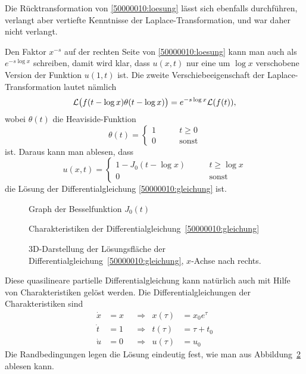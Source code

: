 \begin{diskussion}
Die Rücktransformation von \eqref{50000010:loesung} lässt sich
ebenfalls durchführen, verlangt aber vertiefte Kenntnisse der
Laplace-Transformation, und war daher nicht verlangt.

Den Faktor $x^{-s}$ auf der rechten Seite von \eqref{50000010:loesung}
kann man auch als $e^{-s\log x}$
schreiben, damit wird klar, dass $u(x,t)$ nur eine um $\log x$ verschobene
Version der Funktion $u(1,t)$ ist. 
Die zweite Verschiebeeigenschaft der Laplace-Transformation lautet nämlich
\[
{\cal L}\bigl(f(t-\log x)\theta(t-\log x)\bigr)
=
e^{-s\log x}{\cal L}(f(t)),
\]
wobei $\theta(t)$ die Heaviside-Funktion
\[
\theta(t)=\begin{cases}1\qquad&t \ge 0\\ 0&\text{sonst}\end{cases}
\]
ist. Daraus kann man ablesen, dass
\begin{equation}
u(x,t)=\begin{cases}
1-J_0(t-\log x)\qquad
&t \ge \log x\\
0
&\text{sonst}
\end{cases}
\label{50000010:ruecktransformiert}
\end{equation}
die Lösung der Differentialgleichung \eqref{50000010:gleichung} ist.
\begin{figure}
\centering
{}
\caption{Graph der Besselfunktion $J_0(t)$
\label{50000010:besselj0}}
\end{figure}
\begin{figure}
\centering
{}
\caption{Charakteristiken der Differentialgleichung~\eqref{50000010:gleichung}
\label{50000010:charakteristiken}}
\end{figure}
\begin{figure}
\centering
{}
\caption{3D-Darstellung der Lösungsfläche der
Differentialgleichung~\eqref{50000010:gleichung}, $x$-Achse nach rechts.
\label{50000010:loesung}}
\end{figure}


Diese quasilineare partielle Differentialgleichung kann natürlich auch
mit Hilfe von Charakteristiken gelöst werden.
Die Differentialgleichungen der Charakteristiken sind
\begin{equation}
\begin{aligned}
\dot x&=x&
&\Rightarrow&
x(\tau)&=x_0e^\tau
\\
\dot t&=1&
&\Rightarrow&
t(\tau)&=\tau + t_0
\\
\dot u&=0&
&\Rightarrow&
u(\tau)&=u_0
\end{aligned}
\label{50000010:chardgl}
\end{equation}
Die Randbedingungen legen die Lösung eindeutig fest, wie man aus
Abbildung~\ref{50000010:charakteristiken} ablesen kann.


\end{diskussion}
